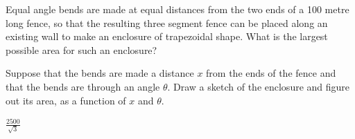 \begin{question}
Equal angle bends are made at equal distances from the two ends of a
100 metre long fence, so that the resulting three segment fence can be placed
along an existing wall to make an enclosure of trapezoidal shape. What
is the largest possible area for such an enclosure?
\end{question}

\begin{hint}
Suppose that the bends are made a  distance $x$ from the ends of the fence
and that the bends are through an angle $\theta$. Draw a sketch of the
enclosure and figure out its area, as a function of $x$ and $\theta$.
\end{hint}

\begin{answer}
$\frac{2500}{\sqrt{3}}$
\end{answer}

